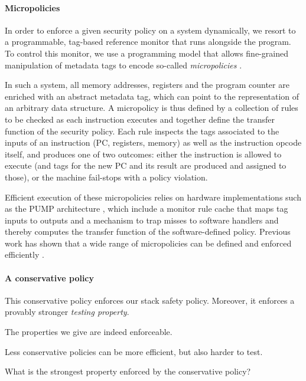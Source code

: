 \documentclass[acmsmall,review,anonymous]{acmart}\settopmatter{printfolios=true,printccs=false,printacmref=false}
\begin{document}

\paragraph*{Micropolicies}
%
In order to enforce a given security policy on a system dynamically, we resort
to a programmable, tag-based reference monitor that runs alongside the program.
To control this monitor, we use a programming model that allows fine-grained
manipulation of metadata tags to encode so-called \emph{micropolicies}
.

In such a system, all memory addresses, registers and the program counter are
enriched with an abstract metadata tag, which can point to the representation of
an arbitrary data structure. A micropolicy is thus defined by a collection of
rules to be checked as each instruction executes and together define the
transfer function of the security policy. Each rule inspects the tags associated
to the inputs of an instruction (PC, registers, memory) as well as the
instruction opcode itself, and produces one of two outcomes: either the
instruction is allowed to execute (and tags for the new PC and its result are
produced and assigned to those), or the machine fail-stops with a policy
violation.

Efficient execution of these micropolicies relies on hardware implementations
such as the PUMP architecture , which include a monitor rule cache that
maps tag inputs to outputs and a mechanism to trap misses to software handlers
and thereby computes the transfer function of the software-defined policy.
Previous work has shown that a wide range of micropolicies can be defined and
enforced efficiently .
%

\paragraph*{A conservative policy}

This conservative policy enforces our stack safety policy. Moreover, it enforces
a provably stronger \emph{testing property}.

The properties we give are indeed enforceable.

Less conservative policies can be more efficient, but also harder to test.

What is the strongest property enforced by the conservative policy?
%
\end{document}
